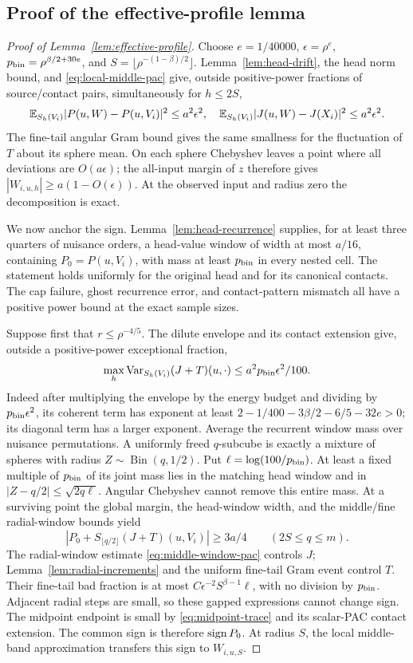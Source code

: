 \subsection{Proof of the effective-profile lemma}
\begin{proof}[Proof of Lemma~\ref{lem:effective-profile}]
Choose $e=1/40000$, $\epsilon=\rho^e$,
$p_{\rm bin}=\rho^{\beta/2+30e}$, and
$S=\lfloor\rho^{-(1-\beta)/2}\rfloor$.
Lemma~\ref{lem:head-drift}, the head norm bound, and
\eqref{eq:local-middle-pac} give, outside positive-power fractions of
source/contact pairs, simultaneously for $h\le2S$,
\[
 \mathbb E_{S_h(V_i)}|P(u,W)-P(u,V_i)|^2\le a^2\epsilon^2,
 \quad
 \mathbb E_{S_h(V_i)}|J(u,W)-J(X_i)|^2\le a^2\epsilon^2.
\]
The fine-tail angular Gram bound gives the same smallness for the
fluctuation of $T$ about its sphere mean. On each sphere Chebyshev
leaves a point where all deviations are $O(a\epsilon)$; the all-input
margin of $z$ therefore gives $|W_{i,u,h}|\ge a(1-O(\epsilon))$.
At the observed input and radius zero the decomposition is exact.

We now anchor the sign. Lemma~\ref{lem:head-recurrence} supplies, for
at least three quarters of nuisance orders, a head-value window of
width at most $a/16$, containing $P_0=P(u,V_i)$, with mass at least
$p_{\rm bin}$ in every nested cell. The statement holds uniformly for
the original head and for its canonical contacts. The cap failure,
ghost recurrence error, and contact-pattern mismatch all have a positive
power bound at the exact sample sizes.

Suppose first that $r\le\rho^{-4/5}$. The dilute envelope and its
contact extension give, outside a positive-power exceptional fraction,
\[
 \max_h\operatorname{Var}_{S_h(V_i)}(J+T)(u,\cdot)
                  \le a^2p_{\rm bin}\epsilon^2/100.
\]
Indeed after multiplying the envelope by the energy budget and dividing
by $p_{\rm bin}\epsilon^2$, its coherent term has exponent at least
$2-1/400-3\beta/2-6/5-32e>0$; its diagonal term has a larger exponent.
Average the recurrent window mass over nuisance permutations. A uniformly
freed $q$-subcube is exactly a mixture of spheres with radius
$Z\sim\operatorname{Bin}(q,1/2)$. Put
$\ell=\log(100/p_{\rm bin})$. At least a fixed multiple of $p_{\rm bin}$
of its joint mass lies in the matching head window and in
$|Z-q/2|\le\sqrt{2q\ell}$. Angular Chebyshev cannot remove this entire
mass. At a surviving point the global margin, the head-window width,
and the middle/fine radial-window bounds yield
\[
 |P_0+S_{\lfloor q/2\rfloor}(J+T)(u,V_i)|\ge3a/4
                 \qquad(2S\le q\le m).
\]
The radial-window estimate \eqref{eq:middle-window-pac} controls $J$;
Lemma~\ref{lem:radial-increments} and the uniform fine-tail Gram event
control $T$. Their fine-tail bad fraction is at most
$C\epsilon^{-2}S^{\beta-1}\ell$, with no division by $p_{\rm bin}$.
Adjacent radial steps are small, so these gapped expressions cannot
change sign. The midpoint endpoint is small by
\eqref{eq:midpoint-trace} and its scalar-PAC contact extension.
The common sign is therefore $\operatorname{sign} P_0$. At radius $S$, the local
middle-band approximation transfers this sign to $W_{i,u,S}$.


\end{proof}

